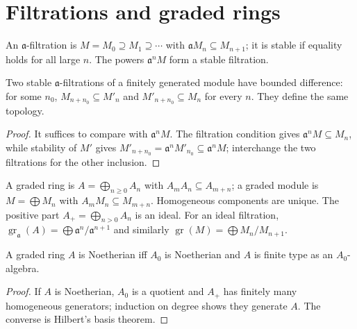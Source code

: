 \section{Filtrations and graded rings}
\label{am-ch10-filtrations}
\begin{definition}[Filtration]
\label{am-def-filtration}
\uses{}
An $\mathfrak{a}$-filtration is $M=M_0\supseteq M_1\supseteq\cdots$ with
$\mathfrak{a} M_n\subseteq M_{n+1}$; it is stable if equality holds for all large
$n$.  The powers $\mathfrak{a}^nM$ form a stable filtration.
\end{definition}
\begin{lemma}
\label{am-lem-10-6}
\uses{}
Two stable $\mathfrak{a}$-filtrations of a finitely generated module have bounded
difference: for some $n_0$, $M_{n+n_0}\subseteq M'_n$ and
$M'_{n+n_0}\subseteq M_n$ for every $n$.  They define the same topology.
\end{lemma}
\begin{proof}
It suffices to compare with $\mathfrak{a}^nM$.  The filtration condition gives
$\mathfrak{a}^nM\subseteq M_n$, while stability of $M'$ gives
$M'_{n+n_0}=\mathfrak{a}^nM'_{n_0}\subseteq\mathfrak{a}^nM$; interchange the two
filtrations for the other inclusion.
\end{proof}
\begin{definition}
\label{am-def-graded}
\uses{}
A graded ring is $A=\bigoplus_{n\ge0}A_n$ with $A_mA_n\subseteq A_{m+n}$;
a graded module is $M=\bigoplus M_n$ with $A_mM_n\subseteq M_{m+n}$.
Homogeneous components are unique.  The positive part $A_+=\bigoplus_{n>0}A_n$
is an ideal.  For an ideal filtration, $\operatorname{gr}_{\mathfrak{a}}(A)=\bigoplus
\mathfrak{a}^n/\mathfrak{a}^{n+1}$ and similarly
$\operatorname{gr}(M)=\bigoplus M_n/M_{n+1}$.
\end{definition}
\begin{proposition}
\label{am-prop-10-7}
\uses{}
A graded ring $A$ is Noetherian iff $A_0$ is Noetherian and $A$ is finite type
as an $A_0$-algebra.
\end{proposition}
\begin{proof}
If $A$ is Noetherian, $A_0$ is a quotient and $A_+$ has finitely many
homogeneous generators; induction on degree shows they generate $A$.  The
converse is Hilbert's basis theorem.
\end{proof}
